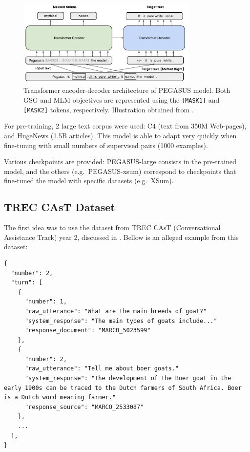 \documentclass[a4paper, 10pt]{article}
\begin{document}
        \begin{figure}[!htb]
            \centering
            \includegraphics[width=0.8\textwidth]{Figures/pegasus.pdf}
            \caption{Transformer encoder-decoder architecture of PEGASUS model. Both GSG and MLM objectives are represented using the \texttt{[MASK1]} and \texttt{[MASK2]} tokens, respectively. Illustration obtained from \cite{Zhang2020b}.}
        \end{figure}
        
        For pre-training, 2 large text corpus were used: C4 (text from 350M Web-pages), and HugeNews (1.5B articles). This model is able to adapt very quickly when fine-tuning with small numbers of supervised pairs (1000 examples).
        
        Various checkpoints are provided: PEGASUS-large consists in the pre-trained model, and the others (e.g.\ PEGASUS-xsum) correspond to checkpoints that fine-tuned the model with specific datasets (e.g.\ XSum).
        
    \subsection{TREC CAsT Dataset}
        
        The first idea was to use the dataset from TREC CAsT (Conversational Assistance Track) year 2, discussed in \cite{Dalton2020}. Bellow is an alleged example from this dataset:

        \begin{lstlisting}[style=json]
{
  "number": 2,
  "turn": [
    {
      "number": 1,
      "raw_utterance": "What are the main breeds of goat?"
      "system_response": "The main types of goats include..."
      "response_document": "MARCO_5023599"
    },
    {
      "number": 2,
      "raw_utterance": "Tell me about boer goats."
      "system_response": "The development of the Boer goat in the early 1900s can be traced to the Dutch farmers of South Africa. Boer is a Dutch word meaning farmer."
      "response_source": "MARCO_2533087"
    },
    ...
  ],
}
        \end{lstlisting}
\end{document}

